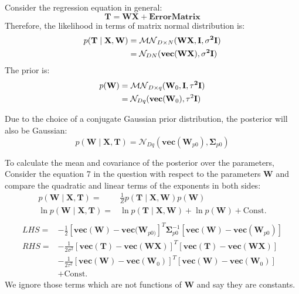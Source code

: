 \documentclass[12pt]{article}
\newenvironment{question}[2][Question]{\begin{trivlist}
\kern10pt
\item[\hskip \labelsep {\bfseries #1}\hskip \labelsep {\bfseries #2.}]}{\end{trivlist}}
\begin{document}
\begin{question}{5}
Consider the regression equation in general:
$$\textbf{T} = \textbf{WX} + \textbf{ErrorMatrix} $$
Therefore, the likelihood in terms of matrix normal distribution is:
\begin{align*}
p(\bf{T}\mid \bf{X}, \bf{W}) &= 
  \mathcal{MN}_{D \times N}(\bf{WX}, \bf{I}, \sigma^2 \bf{I}) \\ 
  &= \mathcal{N}_{DN}(\bf{vec}(\bf{WX}), \sigma^2 \bf{I})
\end{align*}
The prior is:
\begin{align*}
p(\bf{W}) &= 
  \mathcal{MN}_{D \times q}(\textbf{W}_0, \bf{I}, \tau^2 \bf{I}) \\
  &= \mathcal{N}_{Dq}(\textbf{vec}(\textbf{W}_0), \tau^2 \bf{I})
\end{align*}

Due to the choice of a conjugate Gaussian prior distribution, the posterior will 
also be Gaussian:
$$
p(\textbf{W}\mid \textbf{X}, \textbf{T}) =
  \mathcal{N}_{Dq}(\textbf{vec}(\textbf{W}_{p0}), \bm{\Sigma}_{p0} )
$$

To calculate the mean and covariance of the posterior over the parameters,
Consider the equation 7 in the question with respect to the parameters $\textbf{W}$
 and compare the quadratic and linear terms of the exponents in both sides:
\begin{align*}
  p(\textbf{W}\mid \textbf{X}, \textbf{T}) =&
  \frac{1}{Z}p(\textbf{T}\mid \textbf{X}, \textbf{W})p(\textbf{W})  \\
  \ln p(\textbf{W}\mid \textbf{X}, \textbf{T}) =&
  \ln p(\textbf{T}\mid \textbf{X}, \textbf{W}) + \ln p(\textbf{W}) + \text{Const.} \\
\end{align*}
\begin{align*}
  LHS =& -\frac12[\textbf{vec}(\textbf{W}) - \textbf{vec}(\textbf{W}_{p0)}]^T
          \bm{\Sigma}_{p0}^{-1}[\textbf{vec}(\textbf{W})-\textbf{vec}(\textbf{W}_{p0})] \\
  RHS =& -\frac{1}{2\sigma^2}[\textbf{vec}(\textbf{T}) - \textbf{vec}(\textbf{WX})]^T
                             [\textbf{vec}(\textbf{T}) - \textbf{vec}(\textbf{WX})] \\
       &-\frac{1}{2\tau^2}[\textbf{vec}(\textbf{W}) - \textbf{vec}(\textbf{W}_0)]^T
                          [\textbf{vec}(\textbf{W}) - \textbf{vec}(\textbf{W}_0)] \\
       &+\text{Const.}
\end{align*}
We ignore those terms which are not functions of $\mathbf{W}$ and say they are constants.


\end{question}
\end{document}
